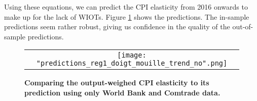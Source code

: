 \documentclass[11pt,a4paper]{article}
\begin{document}
Using these equations, we can predict the CPI elasticity from 2016 onwards to make up for the lack of WIOTs.
Figure \ref{fig:panel_pred3} shows the predictions. The in-sample predictions seem  rather robust, giving us confidence in the quality of the out-of-sample predictions.


\begin{figure}[!h]
	\centering
	\caption{\footnotesize{\textbf{Comparing the output-weighed CPI elasticity to its prediction using only World Bank and Comtrade data.}}}
	\begin{tabular}{c}
		\texttt{[image: "predictions\_reg1\_doigt\_mouille\_trend\_no".png]}\\
	\end{tabular}
	\label{fig:panel_pred3}
\end{figure}
\end{document}
